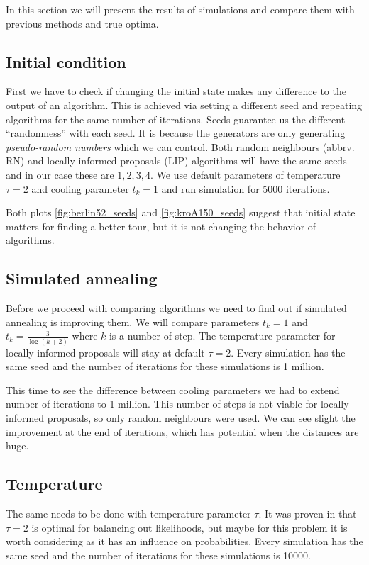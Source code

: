 In this section we will present the results of simulations and compare them with previous methods and true optima.

\subsection{Initial condition}
	First we have to check if changing the initial state makes any difference to the output of an algorithm. This is achieved via setting a different seed and repeating algorithms for the same number of iterations. Seeds guarantee us the different ``randomness'' with each seed. It is because the generators are only generating \textit{pseudo-random numbers} which we can control. Both random neighbours (abbrv. RN) and locally-informed proposals (LIP) algorithms will have the same seeds and in our case these are $1,2,3,4$. We use default parameters of temperature $\tau=2$ and cooling parameter $t_k=1$ and run simulation for 5000 iterations.
	

	Both plots \ref{fig:berlin52_seeds} and \ref{fig:kroA150_seeds} suggest that initial state matters for finding a better tour, but it is not changing the behavior of algorithms.
	
\subsection{Simulated annealing}
	Before we proceed with comparing algorithms we need to find out if simulated annealing is improving them. We will compare parameters $t_k=1$ and $t_k= \frac{3}{\log(k+2)}$ where $k$ is a number of step. The temperature parameter for locally-informed proposals will stay at default $\tau=2$. Every simulation has the same seed and the number of iterations for these simulations is 1 million.
	
	
	
	This time to see the difference between cooling parameters we had to extend number of iterations to 1 million. This number of steps is not viable for locally-informed proposals, so only random neighbours were used. We can see slight the improvement at the end of iterations, which has potential when the distances are huge. 
	
\subsection{Temperature}
	The same needs to be done with temperature parameter $\tau$. It was proven in \cite{zanella2020informed} that $\tau=2$ is optimal for balancing out likelihoods, but maybe for this problem it is worth considering as it has an influence on probabilities. Every simulation has the same seed and the number of iterations for these simulations is 10000.
	
